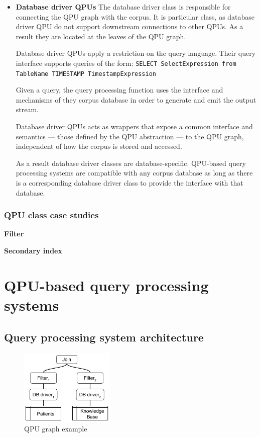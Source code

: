 \begin{itemize}
\begin{itemize}
    \end{itemize}

  \item \textbf{Database driver QPUs}
  The database driver class is responsible for connecting the QPU graph with the corpus.
  It is particular class, as database driver QPU do not support downstream connections to other QPUs.
  As a result they are located at the leaves of the QPU graph.

  Database driver QPUs apply a restriction on the query language.
  Their query interface supports queries of the form:
  {\obeylines\obeyspaces
  \texttt{SELECT SelectExpression from TableName TIMESTAMP TimestampExpression}}

  Given a query, the query processing function uses the interface and mechanisms of they corpus database in order to generate and emit
  the output stream.

  Database driver QPUs acts as wrappers that expose a common interface and semantics --- those defined by the QPU abstraction --- to the
  QPU graph, independent of how the corpus is stored and accessed.

  As a result database driver classes are database-specific.
  QPU-based query processing systems are compatible with any corpus database as long as there is a corresponding database driver class
  to provide the interface with that database.
\end{itemize}

\subsubsection{QPU class case studies}

\textbf{Filter}

\bigskip
\noindent
\textbf{Secondary index}


\section{QPU-based query processing systems}


\subsection{Query processing system architecture}

\begin{figure}[t]
  \centering
    \includegraphics[width=0.4\textwidth]{./figures/design_pattern/qpu_graph_emergent_properties.pdf}
  \caption{QPU graph example}
  \label{fig:qpu_graph_emergent_properties}
\end{figure}

